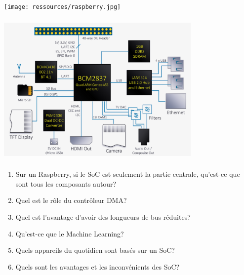 \documentclass[svgnames,11pt]{beamer}
\begin{document}
\begin{frame}
    \frametitle{}

    \begin{center}
        \texttt{[image: ressources/raspberry.jpg]}
    \end{center}

\end{frame}
\begin{frame}
    \frametitle{}
\begin{center}
\centering
\includegraphics[width=10cm]{ressources/raspberry-schema.png}
\label{IMG}
\end{center}

\end{frame}
\begin{frame}
    \frametitle{}

    \begin{activite}
    \begin{enumerate}
        \item Sur un Raspberry, si le SoC est seulement la partie centrale, qu'est-ce que sont tous les composants autour?
        \item Quel est le rôle du contrôleur DMA?
        \item Quel est l'avantage d'avoir des longueurs de bus réduites?
        \item Qu'est-ce que le Machine Learning?
        \item Quels appareils du quotidien sont basés sur un SoC?
        \item Quels sont les avantages et les inconvénients des SoC?
    \end{enumerate}
    \end{activite}
\end{frame}
\end{document}
